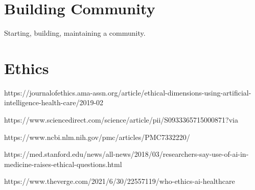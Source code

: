 \documentclass[../main.tex]{subfiles}
\begin{document}
    \section{Building Community}

        Starting, building, maintaining a community.

    \section{Ethics}

    https://journalofethics.ama-assn.org/article/ethical-dimensions-using-artificial-intelligence-health-care/2019-02

    https://www.sciencedirect.com/science/article/pii/S0933365715000871?via%

    https://www.ncbi.nlm.nih.gov/pmc/articles/PMC7332220/

    https://med.stanford.edu/news/all-news/2018/03/researchers-say-use-of-ai-in-medicine-raises-ethical-questions.html

    https://www.theverge.com/2021/6/30/22557119/who-ethics-ai-healthcare
\end{document}
